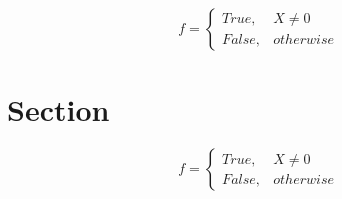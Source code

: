 \documentclass[a4paper]{article}
\begin{document}
\begin{equation}   f =
\begin{cases} True, & X \neq 0\\
False, & otherwise
\end{cases}
\end{equation}

\section{Section}

\begin{equation}   f =
\begin{cases} True, & X \neq 0\\
False, & otherwise
\end{cases}
\end{equation}
\end{document}
